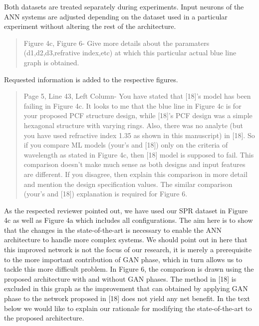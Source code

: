 \documentclass{article}
\begin{document}
	Both datasets are treated separately during experiments. Input neurons of the ANN systems are adjusted depending on the dataset used in a particular experiment without altering the rest of the architecture.
	
	
	\begin{quote}
	Figure 4c, Figure 6- Give more details about the paramaters (d1,d2,d3,refrative index,etc) at which this particular actual blue line graph is obtained.
	\end{quote}

	Requested information is added to the respective figures.
	
	
	\begin{quote}
	Page 5, Line 43, Left Column- You have stated that [18]'s model has been failing in Figure 4c. It looks to me that the blue line in Figure 4c is for your proposed PCF structure design, while [18]'s PCF design was a simple hexagonal structure with varying rings. Also, there was no analyte (but you have used refractive index 1.35 as shown in this manuscript) in [18]. So if you compare ML models (your's and [18]) only on the criteria of wavelength as stated in Figure 4c, then [18] model is supposed to fail. This comparison doesn't make much sense as both designs and input features are different. If you disagree, then explain this comparison in more detail and mention the design specification values.
	The similar comparison (your's and [18]) explanation is required for Figure 6.
	\end{quote}
	
	As the respected reviewer pointed out, we have used our SPR dataset in Figure 4c as well as Figure 4a which includes all configurations. The aim here is to show that the changes in the state-of-the-art is necessary to enable the ANN architecture to handle more complex systems. We should point out in here that this improved network is not the focus of our research, it is merely a prerequisite to the more important contribution of GAN phase, which in turn allows us to tackle this more difficult problem. In Figure 6, the comparison is drawn using the proposed architecture with and without GAN phases. The method in [18] is excluded in this graph as the improvement that can obtained by applying GAN phase to the network proposed in [18] does not yield any net benefit. In the text below we would like to explain our rationale for modifying the state-of-the-art to the proposed architecture.
	
\end{document}
